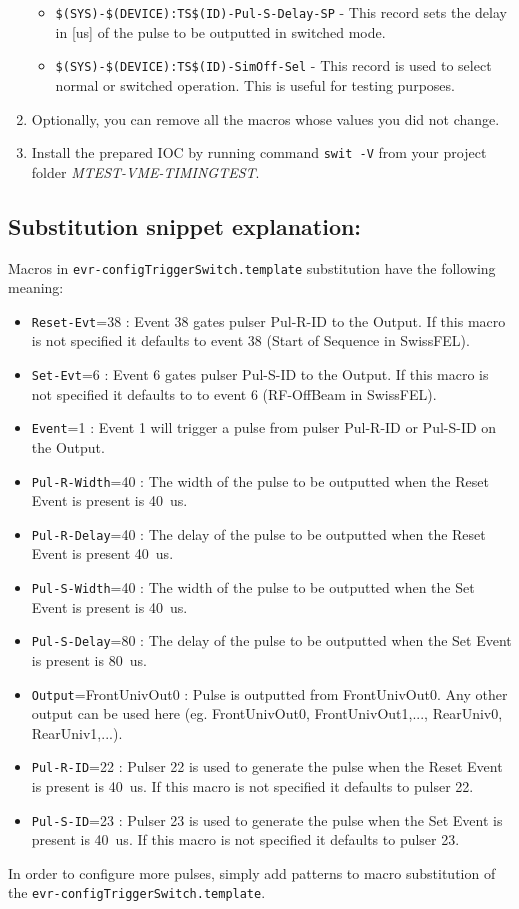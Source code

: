\documentclass[12pt,a4paper]{article}
\begin{document}
\begin{enumerate}
\begin{itemize}
		\item \texttt{\$(SYS)-\$(DEVICE):TS\$(ID)-Pul-S-Delay-SP} - This record sets the delay in [us] of the pulse to be outputted in switched mode.
		
		\item \texttt{\$(SYS)-\$(DEVICE):TS\$(ID)-SimOff-Sel} - This record is used to select normal or switched operation. This is useful for testing purposes.
	\end{itemize}
	
	\item Optionally, you can remove all the macros whose values you did not change. 
	\item Install the prepared IOC by running command \texttt{swit -V} from your project folder \textit{MTEST-VME-TIMINGTEST}.
\end{enumerate}
\subsection{Substitution snippet explanation:}\label{sec:explain_2pulsers}
Macros in \texttt{evr-configTriggerSwitch.template} substitution have the following meaning:
\begin{itemize}
	\item \texttt{Reset-Evt}=38 : Event 38 gates pulser Pul-R-ID to the Output. If this macro is not specified it defaults to event 38 (Start of Sequence in SwissFEL).
	\item \texttt{Set-Evt}=6 : Event 6 gates pulser Pul-S-ID to the Output. If this macro is not specified it defaults to to event 6 (RF-OffBeam in SwissFEL).
	\item \texttt{Event}=1 : Event 1 will trigger a pulse from pulser Pul-R-ID or Pul-S-ID on the Output.
	\item \texttt{Pul-R-Width}=40 : The width of the pulse to be outputted when the Reset Event is present is 40~us.
	\item \texttt{Pul-R-Delay}=40 : The delay of the pulse to be outputted when the Reset Event is present 40~us.
	\item \texttt{Pul-S-Width}=40 : The width of the pulse to be outputted when the Set Event is present is 40~us.
	\item \texttt{Pul-S-Delay}=80 : The delay of the pulse to be outputted when the Set Event is present is 80~us.
	\item \texttt{Output}=FrontUnivOut0 : Pulse is outputted from FrontUnivOut0. Any other output can be used here (eg. FrontUnivOut0, FrontUnivOut1,..., RearUniv0, RearUniv1,...).
	\item \texttt{Pul-R-ID}=22 : Pulser 22 is used to generate the pulse when the Reset Event is present is 40~us. If this macro is not specified it defaults to pulser 22.
	\item \texttt{Pul-S-ID}=23 : Pulser 23 is used to generate the pulse when the Set Event is present is 40~us. If this macro is not specified it defaults to pulser 23.
\end{itemize}
In order to configure more pulses, simply add patterns to macro substitution of the \texttt{evr-configTriggerSwitch.template}.
\end{document}
